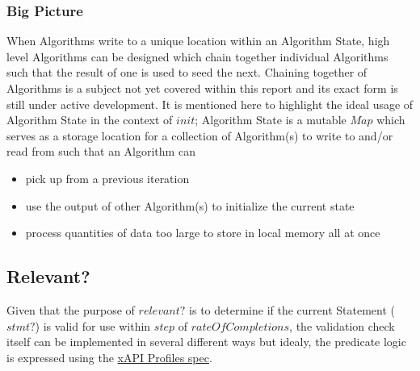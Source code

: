\documentclass[../main.tex]{subfiles}
\begin{document}
\subsubsection{Big Picture}
When Algorithms write to a unique location within an Algorithm State, high level Algorithms can be designed which
chain together individual Algorithms such that the result of one is used to seed the next. Chaining together of Algorithms
is a subject not yet covered within this report and its exact form is still under active development. It is mentioned here
to highlight the ideal usage of Algorithm State in the context of $init$; Algorithm State is a mutable $Map$ which
serves as a storage location for a collection of Algorithm(s) to write to and/or read from such that an Algorithm
can
\begin{itemize}
\item pick up from a previous iteration
\item use the output of other Algorithm(s) to initialize the current state
\item process quantities of data too large to store in local memory all at once
\end{itemize}

\subsection{Relevant?}
Given that the purpose of $relevant?$ is to determine if the current Statement ($stmt?$)
is valid for use within $step$ of $rateOfCompletions$, the validation check itself can
be implemented in several different ways but idealy, the predicate logic is expressed using the
\href{https://github.com/adlnet/xapi-profiles/blob/master/xapi-profiles-about.md}{xAPI Profiles spec}.
\end{document}
